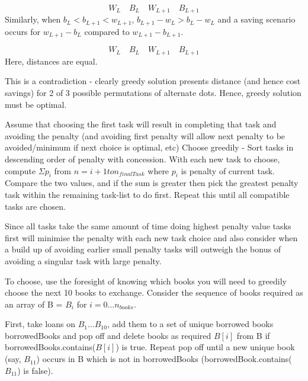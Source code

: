 \documentclass[11pt, a4paper]{article}
\begin{document}
{{{\[ W_L \quad B_L \quad W_{L+1} \quad B_{L+1} \]
Similarly, when $b_L < b_{L+1} < w_{L+1}$, $b_{L+1} - w_L > b_L - w_L$ and a saving scenario occurs for $w_{L+1} - b_L$ compared to $w_{L+1} - b_{L+1}$.

\[ W_L \quad B_L \quad W_{L+1} \quad B_{L+1} \]
Here, distances are equal.

This is a contradiction - clearly greedy solution presents distance (and hence cost savings) for 2 of 3 possible permutations of alternate dots. Hence, greedy solution must be optimal.

\vspace{5mm}


Assume that choosing the first task will result in completing that task and avoiding the penalty (and avoiding first penalty will allow next penalty to be avoided/minimum if next choice is optimal, etc)
Choose greedily - Sort tasks in descending order of penalty with concession.
With each new task to choose, compute $\Sigma p_{i}$ from $n = i+1 to n_{finalTask}$  where $p_i$ is penalty of current task. Compare the two values, and if the sum is greater then pick the greatest penalty task within the remaining task-list to do first. Repeat this until all compatible tasks are chosen.

Since all tasks take the same amount of time doing highest penalty value tasks first will minimise the penalty with each new task choice and also consider when a build up of avoiding earlier small penalty tasks will outweigh the bonus of avoiding a singular task with large penalty.




To choose, use the foresight of knowing which books you will need to greedily choose the next 10 books to exchange. Consider the sequence of books required as an array of B = $B_i $ for $i = 0 \dots n_{books}$.

First, take loans on $B_1 \dots B_10$, add them to a set of unique borrowed books borrowedBooks and pop off and delete books as required $B[i]$ from B if borrowedBooks.contains($B[i]$) is true. Repeat pop off until a new unique book (say, $B_{11}$) occurs in B which is not in borrowedBooks (borrowedBook.contains($B_{11}$) is false).

}}}
\end{document}
